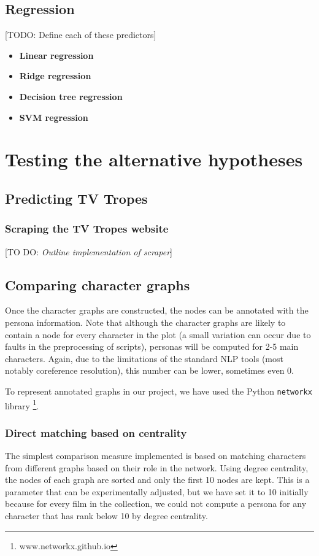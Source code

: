 \documentclass[bsc,frontabs,singlespacing,parskip, twoside]{infthesis}
\begin{document}
\subsection{Regression}
[TODO: Define each of these predictors]
\begin{itemize}
	\item \textbf{Linear regression}
	\item \textbf{Ridge regression}
	\item \textbf{Decision tree regression}
	\item \textbf{SVM regression}
\end{itemize}

\section{Testing the alternative hypotheses}
\label{sec:alt_hyp_implementation}

\subsection{Predicting TV Tropes}
\subsubsection{Scraping the TV Tropes website}
[TO DO: \textit{Outline implementation of scraper}]

\subsection{Comparing character graphs}
Once the character graphs are constructed, the nodes can be annotated with the persona information. Note that although the character graphs are likely to contain a node for every character in the plot (a small variation can occur due to faults in the preprocessing of scripts), personas will be computed for 2-5 main characters. Again, due to the limitations of the standard NLP tools (most notably coreference resolution), this number can be lower, sometimes even 0.

To represent annotated graphs in our project, we have used the Python \texttt{networkx} library \footnote{www.networkx.github.io}.

\subsubsection{Direct matching based on centrality}
The simplest comparison measure implemented is based on matching characters from different graphs based on their role in the network. Using degree centrality, the nodes of each graph are sorted and only the first 10 nodes are kept. This is a parameter that can be experimentally adjusted, but we have set it to 10 initially because for every film in the collection, we could not compute a persona for any character that has rank below 10 by degree centrality.
\end{document}

